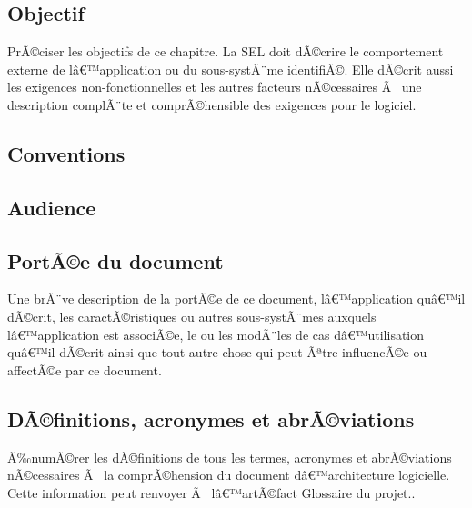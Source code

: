 \documentclass[a4paper, french, 10pt]{report}
\begin{document}
\subsection{Objectif}
PrÃ©ciser les objectifs de ce chapitre. La SEL doit dÃ©crire le comportement externe de lâ€™application ou du sous-systÃ¨me identifiÃ©. Elle dÃ©crit aussi les exigences non-fonctionnelles et les autres facteurs nÃ©cessaires Ã  une description complÃ¨te et comprÃ©hensible des exigences pour le logiciel.

	\subsection{Conventions}

	\subsection{Audience}

	\subsection{PortÃ©e du document}
Une brÃ¨ve description de la portÃ©e de ce document, lâ€™application quâ€™il dÃ©crit, les caractÃ©ristiques ou autres sous-systÃ¨mes auxquels lâ€™application est associÃ©e, le ou les modÃ¨les de cas dâ€™utilisation quâ€™il dÃ©crit ainsi que tout autre chose qui peut Ãªtre influencÃ©e ou affectÃ©e par ce document.

	\subsection{DÃ©finitions, acronymes et abrÃ©viations}
	Ã‰numÃ©rer les dÃ©finitions de tous les termes, acronymes et abrÃ©viations nÃ©cessaires Ã  la comprÃ©hension du document dâ€™architecture logicielle. Cette information peut renvoyer Ã  lâ€™artÃ©fact Glossaire du projet..
\end{document}
